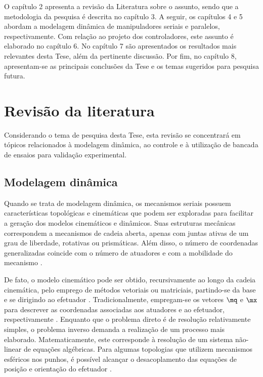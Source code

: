 \documentclass[]{politex}
\begin{document}
O capítulo 2 apresenta a revisão da Literatura sobre o assunto, sendo que a metodologia da pesquisa é descrita no capítulo 3. A seguir, os capítulos 4 e 5 abordam a modelagem dinâmica de manipuladores seriais e paralelos, respectivamente. Com relação ao projeto dos controladores, este assunto é elaborado no capítulo 6. No capítulo 7 são apresentados os resultados mais relevantes desta Tese, além da pertinente discussão. Por fim, no capítulo 8, apresentam-se as principais conclusões da Tese e os temas sugeridos para pesquisa futura.

\chapter{Revisão da literatura}\label{revision}

Considerando o tema de pesquisa desta Tese, esta revisão se concentrará em tópicos relacionados à modelagem dinâmica, ao controle e à utilização de bancada de ensaios para validação experimental.


\section{Modelagem dinâmica}

Quando se trata de modelagem dinâmica, os mecanismos seriais possuem características topológicas e cinemáticas que podem ser exploradas para facilitar a geração dos modelos cinemáticos e dinâmicos. Suas estruturas mecânicas correspondem a mecanismos de cadeia aberta, apenas com juntas ativas de um grau de liberdade, rotativas ou prismáticas. Além disso, o número de coordenadas generalizadas coincide com o número de atuadores e com a mobilidade do mecanismo \cite{Craig}. 

De fato, o modelo cinemático pode ser obtido, recursivamente ao longo da cadeia cinemática, pelo emprego de métodos vetoriais ou matriciais, partindo-se da base e se dirigindo ao efetuador \cite{Siciliano}. Tradicionalmente, empregam-se os vetores $\mq$ e $\mx$ para descrever as coordenadas associadas aos atuadores e ao efetuador, respectivamente \cite{Cabral, Carvalho}. Enquanto que o problema direto é de resolução relativamente simples, o problema inverso demanda a realização de um processo mais elaborado. Matematicamente, este corresponde à resolução de um sistema não-linear de equações algébricas. Para algumas topologias que utilizem mecanismos esféricos nos punhos, é possível alcançar o desacoplamento das equações de posição e orientação do efetuador \cite{Waldron}.
\end{document}
